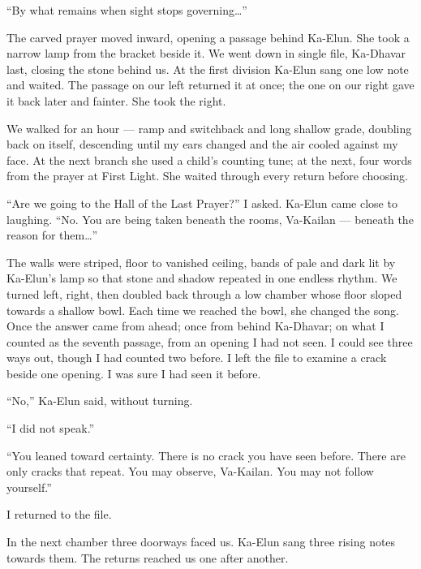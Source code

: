 ``By what remains when sight stops governing\ldots{}''\par

The carved prayer moved inward, opening a passage behind Ka-Elun. She took a narrow lamp from the bracket beside it. We went down in single file, Ka-Dhavar last, closing the stone behind us. At the first division Ka-Elun sang one low note and waited. The passage on our left returned it at once; the one on our right gave it back later and fainter. She took the right.\par

We walked for an hour --- ramp and switchback and long shallow grade, doubling back on itself, descending until my ears changed and the air cooled against my face. At the next branch she used a child's counting tune; at the next, four words from the prayer at First Light. She waited through every return before choosing.\par

``Are we going to the Hall of the Last Prayer?'' I asked. Ka-Elun came close to laughing. ``No. You are being taken beneath the rooms, Va-Kailan --- beneath the reason for them\ldots{}''\par

The walls were striped, floor to vanished ceiling, bands of pale and dark lit by Ka-Elun's lamp so that stone and shadow repeated in one endless rhythm. We turned left, right, then doubled back through a low chamber whose floor sloped towards a shallow bowl. Each time we reached the bowl, she changed the song. Once the answer came from ahead; once from behind Ka-Dhavar; on what I counted as the seventh passage, from an opening I had not seen. I could see three ways out, though I had counted two before. I left the file to examine a crack beside one opening. I was sure I had seen it before.\par

``No,'' Ka-Elun said, without turning.\par

``I did not speak.''\par

``You leaned toward certainty. There is no crack you have seen before. There are only cracks that repeat. You may observe, Va-Kailan. You may not follow yourself.''\par

I returned to the file.\par

In the next chamber three doorways faced us. Ka-Elun sang three rising notes towards them. The returns reached us one after another.\par

